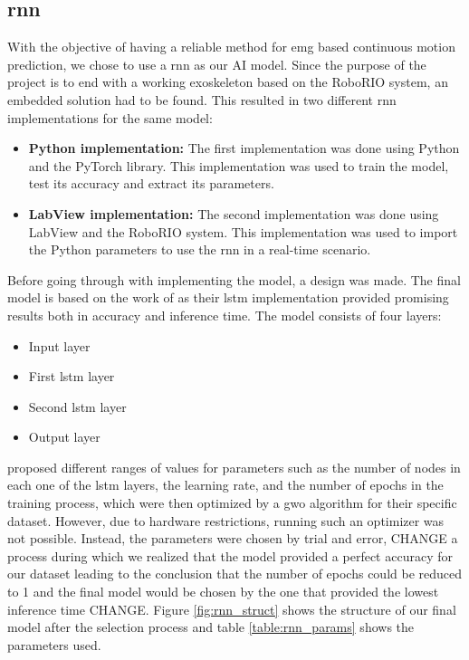 \subsection{\acrfull{rnn}}
With the objective of having a reliable method for \acrshort{emg} based continuous motion prediction, we chose to 
use a \acrshort{rnn} as our AI model. Since the purpose of the project is to end with a working exoskeleton based 
on the RoboRIO system, an embedded solution had to be found. This resulted in two different \acrshort{rnn} 
implementations for the same model:
\begin{itemize}

    \item \textbf{Python implementation:} The first implementation was done using Python and the PyTorch library. 
    This implementation was used to train the model, test its accuracy and extract its parameters.
    
    \item \textbf{LabView implementation:} The second implementation was done using LabView and the RoboRIO system. 
    This implementation was used to import the Python parameters to use the \acrshort{rnn} in a real-time scenario.

\end{itemize}

Before going through with implementing the model, a design was made. The final model is based on the work of \cite{RNNEMG} 
as their \acrfull{lstm} implementation provided promising results both in accuracy and inference time. The model consists 
of four layers:
\begin{itemize}

    \item Input layer

    \item First \acrshort{lstm} layer

    \item Second \acrshort{lstm} layer
    
    \item Output layer

\end{itemize}

\cite{RNNEMG} proposed different ranges of values for parameters such as the number of nodes in each one of the \acrshort{lstm} 
layers, the learning rate, and the number of epochs in the training process, which were then optimized by a \acrfull{gwo} 
algorithm for their specific dataset. However, due to hardware restrictions, running such an optimizer was not possible. Instead, 
the parameters were chosen by trial and error, CHANGE a process during which we realized that the model provided a perfect accuracy 
for our dataset leading to the conclusion that the number of epochs could be reduced to 1 and the final model would be chosen 
by the one that provided the lowest inference time CHANGE. Figure \ref{fig:rnn_struct} shows the structure of our final model after 
the selection process and table \ref{table:rnn_params} shows the parameters used.

